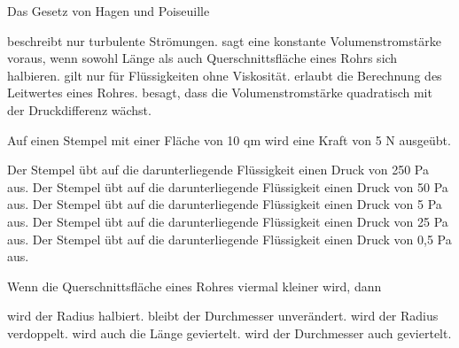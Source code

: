 \documentclass[11pt]{exam}
\begin{document}
\setlength{\voffset}{-0.5in}
\setlength{\headsep}{5pt}

\hspace{2mm}
 \hspace{5mm}
\vspace{4mm}

\begin{questions}

\question Das Gesetz von Hagen und Poiseuille

\begin{choices}
	\choice beschreibt nur turbulente Strömungen.
	\choice sagt eine konstante Volumenstromstärke voraus, wenn sowohl Länge als auch Querschnittsfläche eines Rohrs sich halbieren.
	\choice gilt nur für Flüssigkeiten ohne Viskosität.
	\choice erlaubt die Berechnung des Leitwertes eines Rohres.
	\choice besagt, dass die Volumenstromstärke quadratisch mit der Druckdifferenz wächst.
\end{choices}

\vspace{3mm}\question Auf einen Stempel mit einer Fläche von 10 qm wird eine Kraft von 5 N ausgeübt.

\begin{choices}
	\choice Der Stempel übt auf die darunterliegende Flüssigkeit einen Druck von 250 Pa aus.
	\choice Der Stempel übt auf die darunterliegende Flüssigkeit einen Druck von 50 Pa aus.
	\choice Der Stempel übt auf die darunterliegende Flüssigkeit einen Druck von 5 Pa aus.
	\choice Der Stempel übt auf die darunterliegende Flüssigkeit einen Druck von 25 Pa aus.
	\choice Der Stempel übt auf die darunterliegende Flüssigkeit einen Druck von 0,5 Pa aus.
\end{choices}

\vspace{3mm}\question Wenn die Querschnittsfläche eines Rohres viermal kleiner wird, dann

\begin{choices}
	\choice wird der Radius halbiert.
	\choice bleibt der Durchmesser unverändert.
	\choice wird der Radius verdoppelt.
	\choice wird auch die Länge geviertelt.
	\choice wird der Durchmesser auch geviertelt.
\end{choices}


\end{questions}
\end{document}
